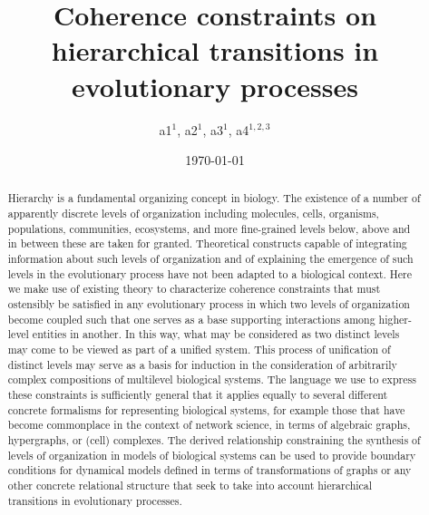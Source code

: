 \documentclass[aps,twocolumn]{revtex4-1}
\begin{document}
 

\title{\bf Coherence constraints on hierarchical transitions in evolutionary processes}

\author{a1$^{1}$, a2$^{1}$, a3$^{1}$, a4$^{1,2,3}$}


\date{\today}
\begin{abstract}
Hierarchy is a fundamental organizing concept in biology. The existence of a number of apparently discrete levels of organization including molecules, cells, organisms, populations, communities, ecosystems, and more fine-grained levels below, above and in between these are taken for granted. Theoretical constructs capable of integrating information about such levels of organization and of explaining the emergence of such levels in the evolutionary process have not been adapted to a biological context. Here we make use of existing theory to characterize coherence constraints that must ostensibly be satisfied in any evolutionary process in which two levels of organization become coupled such that one serves as a base supporting interactions among higher-level entities in another. In this way, what may be considered as two distinct levels may come to be viewed as part of a unified system. This process of unification of distinct levels may serve as a basis for induction in the consideration of arbitrarily complex compositions of multilevel biological systems. The language we use to express these constraints is sufficiently general that it applies equally to several different concrete formalisms for representing biological systems, for example those that have become commonplace in the context of network science, in terms of algebraic graphs, hypergraphs, or (cell) complexes. The derived relationship constraining the synthesis of levels of organization in models of biological systems can be used to provide boundary conditions for dynamical models defined in terms of transformations of graphs or any other concrete relational structure that seek to take into account hierarchical transitions in evolutionary processes.
\end{abstract}

\maketitle
\end{document}
